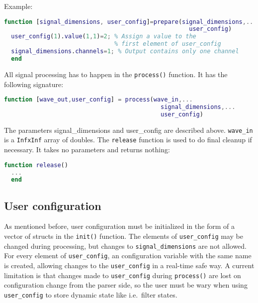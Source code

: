 \documentclass[11pt,a4paper,twoside]{article}
\newcommand{\+}{\discretionary{\mbox{\scriptsize$\hookleftarrow$}}{}{}}
\begin{document}
  Example:
\begin{lstlisting}[language=Matlab]
  function [signal_dimensions, user_config]=prepare(signal_dimensions,...
                                                    user_config)
  user_config(1).value(1,1)=2; % Assign a value to the
                               % first element of user_config 
  signal_dimensions.channels=1; % Output contains only one channel
  end
\end{lstlisting}
All signal processing has to happen in the \texttt{process()} function. It has the following signature:
\begin{lstlisting}[language=Matlab]
  function [wave_out,user_config] = process(wave_in,...
                                            signal_dimensions,...
                                            user_config)
\end{lstlisting}
The parameters signal\_dimensions and user\_config are described above.
\texttt{wave\_in} is a \texttt{InfxInf} array of doubles.
The \texttt{release} function is used to do final cleanup if necessary.
It takes no parameters and returns nothing:
\begin{lstlisting}[language=Matlab]
  function release()
  ...
  end
\end{lstlisting}
\subsection{User configuration}
As mentioned before, user configuration must be initialized in the form of a
vector of structs in the \texttt{init()} function.
The elements of \texttt{user\_config} may be changed during processing,
but changes to \texttt{signal\_dimensions} are not allowed. 
For every element of \texttt{user\_config}, an \mha{} configuration variable
with the same name is created, allowing changes to the \texttt{user\_config} in
a real-time safe way.
A current limitation is that changes made to \texttt{user\_config} during \texttt{process()} are
lost on configuration change from the parser side, so the user must be wary when using \texttt{user\_config} to store
dynamic state like i.e.\ filter states.
\end{document}
